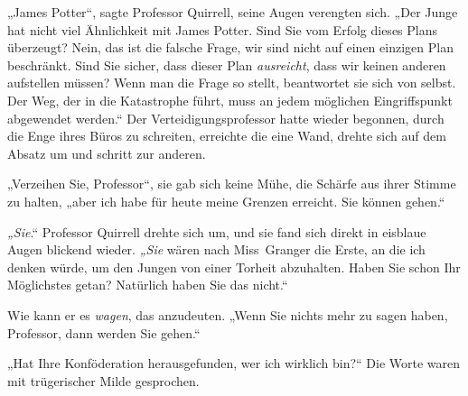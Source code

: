 „James Potter“, sagte Professor Quirrell, seine Augen verengten sich. „Der Junge hat nicht viel Ähnlichkeit mit James Potter. Sind Sie vom Erfolg dieses Plans überzeugt? Nein, das ist die falsche Frage, wir sind nicht auf einen einzigen Plan beschränkt. Sind Sie sicher, dass dieser Plan \emph{ausreicht}, dass wir keinen anderen aufstellen müssen? Wenn man die Frage so stellt, beantwortet sie sich von selbst. Der Weg, der in die Katastrophe führt, muss an jedem möglichen Eingriffspunkt abgewendet werden.“
Der Verteidigungsprofessor hatte wieder begonnen, durch die Enge ihres Büros zu schreiten, erreichte die eine Wand, drehte sich auf dem Absatz um und schritt zur anderen.

„Verzeihen Sie, Professor“, sie gab sich keine Mühe, die Schärfe aus ihrer Stimme zu halten, „aber ich habe für heute meine Grenzen erreicht. Sie können gehen.“

\emph{„Sie}.“ Professor Quirrell drehte sich um, und sie fand sich direkt in eisblaue Augen blickend wieder. \emph{„Sie} wären nach Miss~Granger die Erste, an die ich denken würde, um den Jungen von einer Torheit abzuhalten. Haben Sie schon Ihr Möglichstes getan? Natürlich haben Sie das nicht.“

Wie kann er es \emph{wagen}, das anzudeuten.
„Wenn Sie nichts mehr zu sagen haben, Professor, dann werden Sie gehen.“

„Hat Ihre Konföderation herausgefunden, wer ich wirklich bin?“
Die Worte waren mit trügerischer Milde gesprochen.

